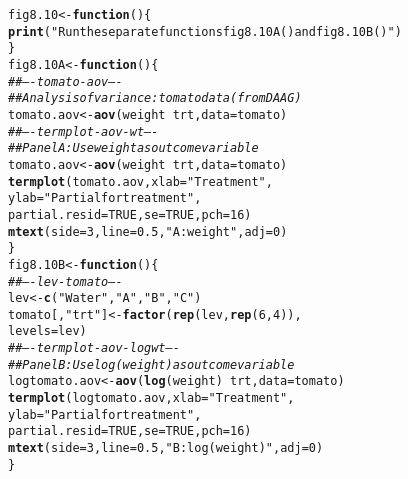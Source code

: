 \documentclass[12pt, a4paper,  BCOR=8.25mm, DIV=15]{scrartcl}\usepackage[]{graphicx}\usepackage[]{color}
\makeatletter
\newcommand{\hlnum}[1]{\textcolor[rgb]{0.686,0.059,0.569}{#1}}%
\newcommand{\hlstr}[1]{\textcolor[rgb]{0.192,0.494,0.8}{#1}}%
\newcommand{\hlcom}[1]{\textcolor[rgb]{0.678,0.584,0.686}{\textit{#1}}}%
\newcommand{\hlopt}[1]{\textcolor[rgb]{0,0,0}{#1}}%
\newcommand{\hlstd}[1]{\textcolor[rgb]{0.345,0.345,0.345}{#1}}%
\newcommand{\hlkwa}[1]{\textcolor[rgb]{0.161,0.373,0.58}{\textbf{#1}}}%
\newcommand{\hlkwb}[1]{\textcolor[rgb]{0.69,0.353,0.396}{#1}}%
\newcommand{\hlkwc}[1]{\textcolor[rgb]{0.333,0.667,0.333}{#1}}%
\newcommand{\hlkwd}[1]{\textcolor[rgb]{0.737,0.353,0.396}{\textbf{#1}}}%
\newenvironment{kframe}{%
 \def\at@end@of@kframe{}%
 \ifinner\ifhmode%
  \def\at@end@of@kframe{\end{minipage}}%
  \begin{minipage}{\columnwidth}%
 \fi\fi%
 \def\FrameCommand##1{\hskip\@totalleftmargin \hskip-\fboxsep
 \colorbox{shadecolor}{##1}\hskip-\fboxsep
     \hskip-\linewidth \hskip-\@totalleftmargin \hskip\columnwidth}%
 \MakeFramed {\advance\hsize-\width
   \@totalleftmargin\z@ \linewidth\hsize
   \@setminipage}}%
 {\par\unskip\endMakeFramed%
 \at@end@of@kframe}
\newenvironment{knitrout}{}{} %
\makeatother
\begin{document}
\begin{knitrout}
\color{fgcolor}\begin{kframe}
\begin{alltt}
\hlstd{fig8.10} \hlkwb{<-} \hlkwa{function}\hlstd{()\{}
\hlkwd{print}\hlstd{(}\hlstr{"Run the separate functions fig8.10A() and fig8.10B()"}\hlstd{)}
\hlstd{\}}
\hlstd{fig8.10A} \hlkwb{<-} \hlkwa{function}\hlstd{()\{}
\hlcom{## ---- tomato-aov ----}
\hlcom{## Analysis of variance: tomato data (from DAAG)}
\hlstd{tomato.aov} \hlkwb{<-} \hlkwd{aov}\hlstd{(weight} \hlopt{~} \hlstd{trt,} \hlkwc{data}\hlstd{=tomato)}
\hlcom{## ---- termplot-aov-wt ----}
\hlcom{## Panel A: Use weight as outcome variable}
\hlstd{tomato.aov} \hlkwb{<-} \hlkwd{aov}\hlstd{(weight} \hlopt{~} \hlstd{trt,} \hlkwc{data}\hlstd{=tomato)}
\hlkwd{termplot}\hlstd{(tomato.aov,} \hlkwc{xlab}\hlstd{=}\hlstr{"Treatment"}\hlstd{,}
         \hlkwc{ylab}\hlstd{=}\hlstr{"Partial for treatment"}\hlstd{,}
         \hlkwc{partial.resid}\hlstd{=}\hlnum{TRUE}\hlstd{,} \hlkwc{se}\hlstd{=}\hlnum{TRUE}\hlstd{,} \hlkwc{pch}\hlstd{=}\hlnum{16}\hlstd{)}
\hlkwd{mtext}\hlstd{(}\hlkwc{side}\hlstd{=}\hlnum{3}\hlstd{,} \hlkwc{line}\hlstd{=}\hlnum{0.5}\hlstd{,} \hlstr{"A: weight"}\hlstd{,} \hlkwc{adj}\hlstd{=}\hlnum{0}\hlstd{)}
\hlstd{\}}
\hlstd{fig8.10B} \hlkwb{<-} \hlkwa{function}\hlstd{()\{}
\hlcom{## ---- lev-tomato ----}
\hlstd{lev} \hlkwb{<-} \hlkwd{c}\hlstd{(}\hlstr{"Water"}\hlstd{,} \hlstr{"A"}\hlstd{,} \hlstr{"B"}\hlstd{,} \hlstr{"C"}\hlstd{)}
\hlstd{tomato[,} \hlstr{"trt"}\hlstd{]} \hlkwb{<-} \hlkwd{factor}\hlstd{(}\hlkwd{rep}\hlstd{(lev,} \hlkwd{rep}\hlstd{(}\hlnum{6}\hlstd{,}\hlnum{4}\hlstd{)),}
                          \hlkwc{levels}\hlstd{=lev)}
\hlcom{## ---- termplot-aov-logwt ----}
\hlcom{## Panel B: Use log(weight) as outcome variable}
\hlstd{logtomato.aov} \hlkwb{<-} \hlkwd{aov}\hlstd{(}\hlkwd{log}\hlstd{(weight)} \hlopt{~} \hlstd{trt,} \hlkwc{data}\hlstd{=tomato)}
\hlkwd{termplot}\hlstd{(logtomato.aov,} \hlkwc{xlab}\hlstd{=}\hlstr{"Treatment"}\hlstd{,}
         \hlkwc{ylab}\hlstd{=}\hlstr{"Partial for treatment"}\hlstd{,}
         \hlkwc{partial.resid}\hlstd{=}\hlnum{TRUE}\hlstd{,} \hlkwc{se}\hlstd{=}\hlnum{TRUE}\hlstd{,} \hlkwc{pch}\hlstd{=}\hlnum{16}\hlstd{)}
\hlkwd{mtext}\hlstd{(}\hlkwc{side}\hlstd{=}\hlnum{3}\hlstd{,} \hlkwc{line}\hlstd{=}\hlnum{0.5}\hlstd{,} \hlstr{"B: log(weight)"}\hlstd{,} \hlkwc{adj}\hlstd{=}\hlnum{0}\hlstd{)}
\hlstd{\}}
\end{alltt}
\end{kframe}
\end{knitrout}
\end{document}
